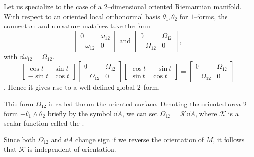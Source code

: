 \documentclass[../main]{subfiles}
\begin{document}
Let us specialize to the case of a $2$--dimensional oriented Riemannian manifold. With respect to an oriented local orthonormal basis $\theta_1, \theta_2$ for $1$--forms, the connection and curvature matrices take the form \[\begin{bmatrix}0 & \omega_{12} \\ -\omega_{12} & 0\end{bmatrix} \text { and } \begin{bmatrix}0 & \Omega_{12} \\ -\Omega_{12} & 0\end{bmatrix},\] with $\dd \omega_{12} = \Omega_{12}$.  \[\begin{bmatrix}\cos t & \sin t \\ -\sin t & \cos t\end{bmatrix} \begin{bmatrix}0 & \Omega_{12} \\ -\Omega_{12} & 0\end{bmatrix} \begin{bmatrix}\cos t & -\sin t \\ \sin t & \cos t\end{bmatrix} = \begin{bmatrix}0 & \Omega_{12} \\ -\Omega_{12} & 0\end{bmatrix}\] . Hence it gives rise to a well defined global $2$--form.

\begin{definition}
This form $\Omega_{12}$ is called the  on the oriented surface. Denoting the oriented area $2$--form $-\theta_1 \wedge \theta_2$ briefly by the symbol $\dd A$, we can set $\Omega_{12} = {\mathcal K} \dd A$, where $\mathcal K$ is a scalar function called the . 
\end{definition}

Since both $\Omega_{12}$ and $\dd A$ change sign if we reverse the orientation of $M$, it follows that $\mathcal K$ is independent of orientation.
\end{document}
